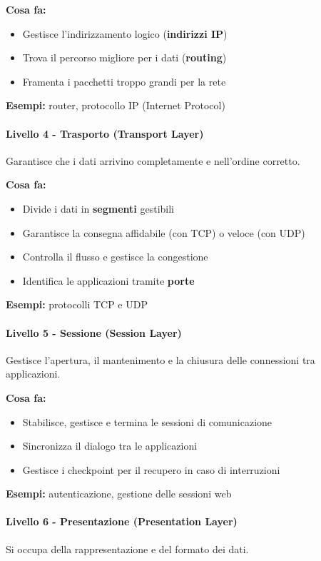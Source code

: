 \documentclass[12pt,a4paper]{article}
\begin{document}
\textbf{Cosa fa:}
\begin{itemize}
    \item Gestisce l'indirizzamento logico (\textbf{indirizzi IP})
    \item Trova il percorso migliore per i dati (\textbf{routing})
    \item Framenta i pacchetti troppo grandi per la rete
\end{itemize}

\textbf{Esempi:} router, protocollo IP (Internet Protocol)

\paragraph{Livello 4 - Trasporto (Transport Layer)}
Garantisce che i dati arrivino completamente e nell'ordine corretto.

\textbf{Cosa fa:}
\begin{itemize}
    \item Divide i dati in \textbf{segmenti} gestibili
    \item Garantisce la consegna affidabile (con TCP) o veloce (con UDP)
    \item Controlla il flusso e gestisce la congestione
    \item Identifica le applicazioni tramite \textbf{porte}
\end{itemize}

\textbf{Esempi:} protocolli TCP e UDP

\paragraph{Livello 5 - Sessione (Session Layer)}
Gestisce l'apertura, il mantenimento e la chiusura delle connessioni tra applicazioni.

\textbf{Cosa fa:}
\begin{itemize}
    \item Stabilisce, gestisce e termina le sessioni di comunicazione
    \item Sincronizza il dialogo tra le applicazioni
    \item Gestisce i checkpoint per il recupero in caso di interruzioni
\end{itemize}

\textbf{Esempi:} autenticazione, gestione delle sessioni web

\paragraph{Livello 6 - Presentazione (Presentation Layer)}
Si occupa della rappresentazione e del formato dei dati.
\end{document}
